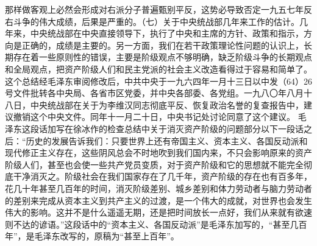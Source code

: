 \begin{maonote}
那样做客观上必然会形成对右派分子普遍甄别平反，这势必导致否定一九五七年反右斗争的伟大成绩，后果是严重的。（七）关于中央统战部几年来工作的估计。几年来，中央统战部在中央直接领导下，执行了中央和主席的方针、政策和指示，方向是正确的，成绩是主要的。另一方面，我们在若干政策理论性问题的认识上，长期存在着一些原则性的错误，主要是阶级观点不够明确，缺乏阶级斗争的长期观点和全局观点，把资产阶级人们和民主党派的社会主义改造看得过于容易和简单了。这个总结经毛泽东审阅修改后，中共中央于一九六四年一月十三日以中发（64）26号文件批转各中央局、各省市区党委，并中央各部委、各党组。一九八〇年八月十八日，中央统战部在关于为李维汉同志彻底平反、恢复政治名誉的复查报告中，建议撤销这个中央文件。同年十一月二十日，中央书记处讨论同意了这个建议。
毛泽东这段话加写在徐冰作的检查总结中关于消灭资产阶级的问题部分以下一段话之后：“历史的发展告诉我们：只要世界上还有帝国主义、资本主义、各国反动派和现代修正主义存在，这些阴风总会不时地吹到我们国内来，不只会影响原来的资产阶级人们，甚至也会使一些共产党员变质，对于资产阶级和它的思想就不能完全彻底干净消灭之。阶级社会在我们国家存在了几千年，资产阶级的存在也有百多年，花几十年甚至几百年的时间，消灭阶级差别、城乡差别和体力劳动者与脑力劳动者的差别来完成从资本主义到共产主义的过渡，是一个伟大的成就，对世界也会发生伟大的影响。这并不是什么遥遥无期，还是把时间放长一点好，我们从来就有欲速则不达的谚语。”这段话中的“资本主义、各国反动派”是毛泽东加写的，“甚至几百年”，是毛泽东改写的，原稿为“甚至上百年”。
\end{maonote}
